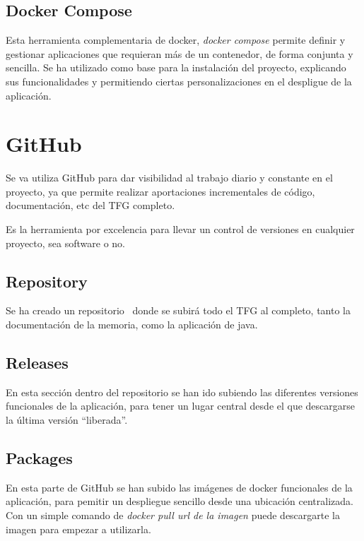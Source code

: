 \subsection{Docker Compose}

Esta herramienta complementaria de docker, \textit{docker compose} \cite{web:dockercompose} permite definir y gestionar aplicaciones que requieran más de un contenedor, de forma conjunta y sencilla.
Se ha utilizado como base para la instalación del proyecto, explicando sus funcionalidades y permitiendo ciertas personalizaciones en el despligue de la aplicación.

\section{GitHub}

Se va utiliza GitHub para dar visibilidad al trabajo diario y constante en el proyecto, ya que permite realizar aportaciones incrementales de código, documentación, etc del TFG completo.

Es la herramienta por excelencia para llevar un control de versiones en cualquier proyecto, sea software o no.

\subsection{Repository}

Se ha creado un repositorio~\cite{github:repo} donde se subirá todo el TFG al completo, tanto la documentación de la memoria, como la aplicación de java.

\subsection{Releases}

En esta sección dentro del repositorio se han ido subiendo las diferentes versiones funcionales de la aplicación, para tener un lugar central desde el que descargarse la última versión ``liberada''.

\subsection{Packages}

En esta parte de GitHub se han subido las imágenes de docker funcionales de la aplicación, para pemitir un despliegue sencillo desde una ubicación centralizada.
Con un simple comando de \textit{docker pull url de la imagen} puede descargarte la imagen para empezar a utilizarla.

